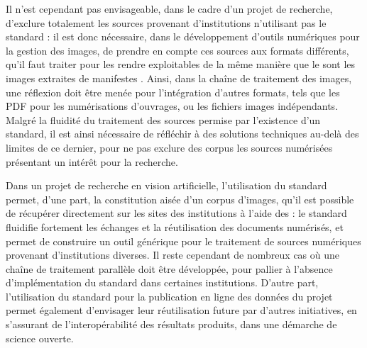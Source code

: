 	Il n'est cependant pas envisageable, dans le cadre d'un projet de recherche, d'exclure totalement les sources provenant d'institutions n'utilisant pas le standard \iiif : il est donc nécessaire, dans le développement d'outils numériques pour la gestion des images, de prendre en compte ces sources aux formats différents, qu'il faut traiter pour les rendre exploitables de la même manière que le sont les images extraites de manifestes \iiif. Ainsi, dans la chaîne de traitement des images, une réflexion doit être menée pour l'intégration d'autres formats, tels que les PDF pour les numérisations d'ouvrages, ou les fichiers images indépendants. Malgré la fluidité du traitement des sources permise par l'existence d'un standard, il est ainsi nécessaire de réfléchir à des solutions techniques au-delà des limites de ce dernier, pour ne pas exclure des corpus les sources numérisées présentant un intérêt pour la recherche. 
	
	Dans un projet de recherche en vision artificielle, l'utilisation du standard \iiif permet, d'une part, la constitution aisée d'un corpus d'images, qu'il est possible de récupérer directement sur les sites des institutions à l'aide des \api : le standard \iiif fluidifie fortement les échanges et la réutilisation des documents numérisés, et permet de construire un outil générique pour le traitement de sources numériques provenant d'institutions diverses. Il reste cependant de nombreux cas où une chaîne de traitement parallèle doit être développée, pour pallier à l'absence d'implémentation du standard dans certaines institutions. D'autre part, l'utilisation du standard \iiif pour la publication en ligne des données du projet permet également d'envisager leur réutilisation future par d'autres initiatives, en s'assurant de l'interopérabilité des résultats produits, dans une démarche de science ouverte.
